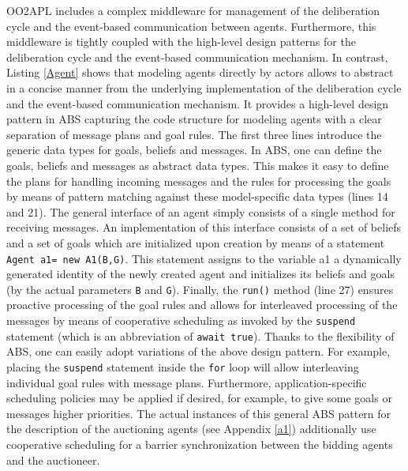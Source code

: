 OO2APL includes a complex middleware for management of the deliberation cycle and the event-based communication between agents. 
Furthermore, this middleware is tightly coupled with the high-level design patterns for the deliberation cycle and the event-based communication mechanism.
In contrast, Listing \ref{Agent} shows that modeling agents directly by actors allows to abstract in a concise manner from the underlying implementation of the deliberation cycle and the event-based communication mechanism.
It provides a high-level design pattern in ABS capturing the code structure for modeling agents with a clear separation of message plans and goal rules. 
The first three lines introduce the generic data types for goals, beliefs and messages.
In ABS, one can define the goals, beliefs and messages as abstract data types.
This makes it easy to define the plans for handling incoming messages and the rules for processing the goals by means of pattern matching against these model-specific data types (lines 14 and 21).
The general interface of an agent simply consists of a single method for receiving messages. An implementation of this interface consists of a set of beliefs and a set of goals which are initialized upon creation by means of a statement
\lstinline|Agent a1= new A1(B,G)|.
This statement assigns to the variable a1 a dynamically generated identity of the newly created agent and initializes its beliefs and goals (by the actual parameters \lstinline|B| and \lstinline|G|).
Finally, the \lstinline|run()| method (line 27) ensures proactive processing of the goal rules and allows for
interleaved processing of the messages by means of cooperative scheduling as invoked by the \lstinline|suspend| statement (which is an abbreviation of \lstinline|await true|).
Thanks to the flexibility of ABS, one can easily adopt variations of the above design pattern.
For example, placing the \lstinline|suspend| statement inside the \lstinline|for| loop will allow interleaving individual goal rules with message plans.
Furthermore, application-specific scheduling policies \cite{rabs,cog} may be applied if desired, for example, to give some goals or messages higher priorities.
The actual instances of this general ABS pattern for the description of the auctioning agents (see Appendix \ref{a1}) additionally use cooperative scheduling for a barrier synchronization between the bidding agents
and the auctioneer. 



